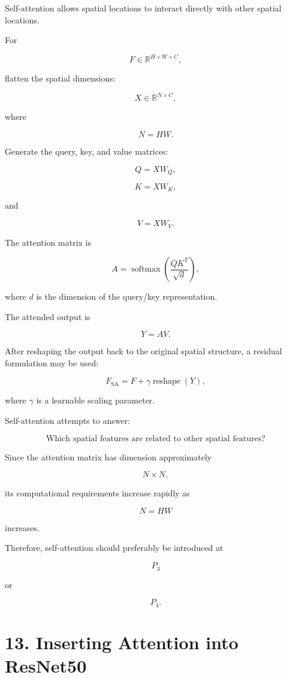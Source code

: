 \documentclass[10pt]{article}
\begin{document}
Self-attention allows spatial locations to interact directly with other
spatial locations.

For

\[
F\in\mathbb{R}^{H\times W\times C},
\]

flatten the spatial dimensions:

\[
X\in\mathbb{R}^{N\times C},
\]

where

\[
N=HW.
\]

Generate the query, key, and value matrices:

\[
Q=XW_Q,
\]

\[
K=XW_K,
\]

and

\[
V=XW_V.
\]

The attention matrix is

\[
A
=
\operatorname{softmax}
\left(
\frac{QK^T}{\sqrt{d}}
\right),
\]

where $d$ is the dimension of the query/key representation.

The attended output is

\[
Y=AV.
\]

After reshaping the output back to the original spatial structure, a residual
formulation may be used:

\[
F_{\mathrm{SA}}
=
F
+
\gamma
\operatorname{reshape}(Y),
\]

where $\gamma$ is a learnable scaling parameter.

Self-attention attempts to answer:

\[
\boxed{
\text{Which spatial features are related to other spatial features?}
}
\]

Since the attention matrix has dimension approximately

\[
N\times N,
\]

its computational requirements increase rapidly as

\[
N=HW
\]

increases.

Therefore, self-attention should preferably be introduced at

\[
P_3
\]

or

\[
P_4.
\]

\section*{13. Inserting Attention into ResNet50}
\end{document}
